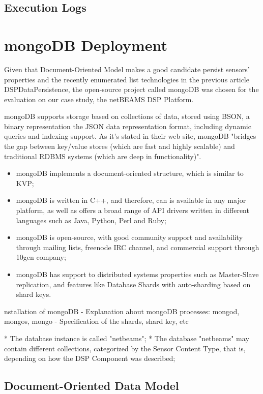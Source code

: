 \subsection{Execution Logs}

\section{mongoDB Deployment}

Given that Document-Oriented Model makes a good candidate persist sensors'
properties and the recently enumerated list technologies in the previous
article DSPDataPersistence, the open-source project called mongoDB was chosen
for the evaluation on our case study, the netBEAMS DSP Platform.

mongoDB supports storage based on collections of data, stored using BSON, a
binary representation the JSON data representation format, including dynamic
queries and indexing support. As it's stated in their web site, mongoDB
"bridges the gap between key/value stores (which are fast and highly scalable)
and traditional RDBMS systems (which are deep in functionality)".

\begin{itemize}
  \item mongoDB implements a document-oriented structure, which is similar to
  KVP;
  \item mongoDB is written in C++, and therefore, can is available in any major
  platform, as well as offers a broad range of API drivers written in different
  languages such as Java, Python, Perl and Ruby; 
  \item mongoDB is open-source, with good community support and availability
  through mailing lists, freenode IRC channel, and commercial support through
  10gen company; 
  \item mongoDB has support to distributed systems properties such as
  Master-Slave replication, and features like Database Shards with
  auto-sharding based on shard keys.
\end{itemize} 

nstallation of mongoDB
- Explanation about mongoDB processes: mongod, mongos, mongo
- Specification of the shards, shard key, etc

    * The database instance is called "netbeams";
    * The database "netbeams" may contain different collections, categorized by
    the Sensor Content Type, that is, depending on how the DSP Component was
    described;  

\subsection{Document-Oriented Data Model}

